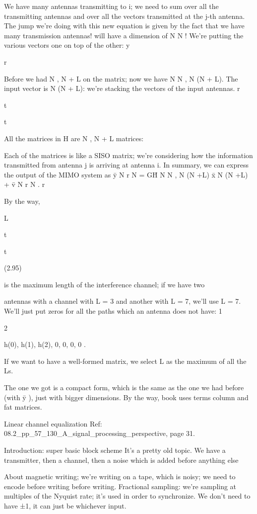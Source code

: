 {We have many antennas transmitting to i; we need to sum over all the transmitting antennas and over all the vectors transmitted at the j-th antenna.
The jump we're doing with this new equation is given by the fact that we have many transmission antennas!
will have a dimension of N N ! We're putting the various vectors one on top of the other:
y

r

Before we had N , N + L on the matrix; now we have N N , N (N + L).
The input vector is N (N + L): we're stacking the vectors of the input antennas.
r

t

t

All the matrices in H are N , N + L matrices:

Each of the matrices is like a SISO matrix; we're considering how the information transmitted from antenna j is arriving at antenna i.
In summary, we can express the output of the MIMO system as ȳ N r N = \sqrt GH̄ N N , N (N +L) x̄ N (N +L) + v̄ N r N .
r

By the way,

L

t

t

(2.95)

is the maximum length of the interference channel; if we have two

antennas with a channel with L = 3 and another with L = 7, we'll use L = 7.
We'll just put zeros for all the paths which an antenna does not have:
1

2

h(0), h(1), h(2), 0, 0, 0, 0 .

If we want to have a well-formed matrix, we select L as the maximum of all the Ls.

The one we got is a compact form, which is the same as the one we had before (with ȳ
), just with bigger dimensions.
By the way, book uses terms column and fat matrices.

Linear channel equalization Ref: 08.2_pp_57_130_A_signal_processing_perspective, page 31.

Introduction: super basic block scheme It's a pretty old topic.
We have a transmitter, then a channel, then a noise which is added before anything else

About magnetic writing; we're writing on a tape, which is noisy; we need to encode before writing before writing.
Fractional sampling: we're sampling at multiples of the Nyquist rate; it's used in order to synchronize.
We don't need to have ±1, it can just be whichever input.

}
